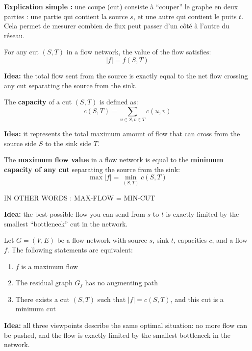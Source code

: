 \documentclass[11pt,a4paper,openany]{book}
\begin{document}
\medskip

\textbf{Explication simple :} une coupe (cut) consiste à “couper” le graphe en deux parties : une partie qui contient la source $s$, et une autre qui contient le puits $t$. Cela permet de mesurer combien de flux peut passer d’un côté à l’autre du réseau.








\begin{defnbox}[title=Flow Conservation Theorem]
For any cut $(S, T)$ in a flow network, the value of the flow satisfies:
\[
|f| = f(S,T)
\]

\textbf{Idea:} the total flow sent from the source is exactly equal to the net flow crossing any cut separating the source from the sink.
\end{defnbox}



\begin{defnbox}[title=Capacity of a Cut]
The \textbf{capacity} of a cut $(S, T)$ is defined as:
\[
c(S,T) = \sum_{u \in S, v \in T} c(u,v)
\]

\textbf{Idea:} it represents the total maximum amount of flow that can cross from the source side $S$ to the sink side $T$.
\end{defnbox}



\begin{defnbox}[title=Max-Flow Min-Cut Theorem]
The \textbf{maximum flow value} in a flow network is equal to the \textbf{minimum capacity of any cut} separating the source from the sink:
\[
\max |f| = \min_{(S,T)} c(S,T)
\]


IN OTHER WORDS : MAX-FLOW = MIN-CUT

\textbf{Idea:} the best possible flow you can send from $s$ to $t$ is exactly limited by the smallest “bottleneck” cut in the network.
\end{defnbox}



\begin{defnbox}[title=Max-Flow Min-Cut Theorem (Equivalent Statements)]
Let $G = (V, E)$ be a flow network with source $s$, sink $t$, capacities $c$, and a flow $f$.
The following statements are equivalent:

\begin{enumerate}
    \item $f$ is a maximum flow
    \item The residual graph $G_f$ has no augmenting path
    \item There exists a cut $(S,T)$ such that $|f| = c(S,T)$, and this cut is a minimum cut
\end{enumerate}

\textbf{Idea:} all three viewpoints describe the same optimal situation: no more flow can be pushed, and the flow is exactly limited by the smallest bottleneck in the network.
\end{defnbox}
\end{document}
